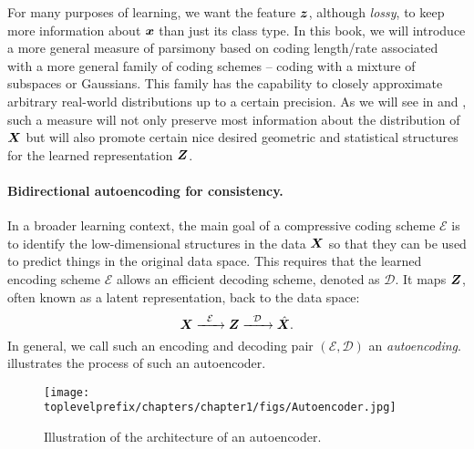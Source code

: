 \documentclass[../../book-main.tex]{subfiles}
\begin{document}
For many purposes of learning, we want the feature $\bm{z}$, although {\em lossy}, to keep more information about $\bm{x}$ than just its class type. In this book, we will introduce a more general measure of parsimony based on coding length/rate associated with a more general family of coding schemes -- coding with a mixture of subspaces or Gaussians. This family has the capability to closely approximate arbitrary real-world distributions up to a certain precision. As we will see in  and , such a measure will not only preserve most information about the distribution of $\bm{X}$ but will also promote certain nice desired geometric and statistical structures for the learned representation $\bm{Z}$. 


\paragraph{Bidirectional autoencoding for consistency.}
In a broader learning context, the main goal of a compressive coding scheme $\mathcal{E}$ is to identify the low-dimensional structures in the data $\bm{X}$ so that they can be used to predict things in the original data space. This requires that the learned encoding scheme $\mathcal{E}$ allows an efficient decoding scheme, denoted as $\mathcal D$. It maps $\bm{Z}$, often known as a latent representation, back to the data space:
\begin{equation}
    \bm{X}   \xrightarrow{\hspace{2mm} \mathcal{E}\hspace{2mm}} \bm{Z}  \xrightarrow{\hspace{2mm} \mathcal{D} \hspace{2mm}} \hat {\bm{X}}.
       \label{eqn:auto-encoding}
\end{equation}
In general, we call such an encoding and decoding pair $(\mathcal{E}, \mathcal{D})$ an {\em autoencoding}.  illustrates the process of such an autoencoder. 
\begin{figure}
    \centering
    \texttt{[image: \\toplevelprefix/chapters/chapter1/figs/Autoencoder.jpg]}
    \caption{Illustration of the architecture of an autoencoder. }
    \label{fig:autoencoder}
\end{figure}
\end{document}
